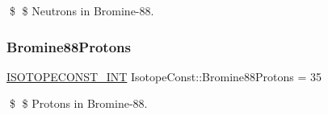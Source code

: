 \$ \$ Neutrons in Bromine-\/88. \mbox{\label{group___isotope_const-_bromine-_br88_gad11b0c52cabb1e8f37e9e9464176d9df}} 
\subsubsection{\texorpdfstring{Bromine88\+Protons}{Bromine88Protons}}
{\footnotesize\ttfamily \mbox{\hyperlink{group___isotope_const-_macros_ga5f18360b3e99483a35c32d789e62621c}{I\+S\+O\+T\+O\+P\+E\+C\+O\+N\+S\+T\+\_\+\+I\+NT}} Isotope\+Const\+::\+Bromine88\+Protons = 35}

\$ \$ Protons in Bromine-\/88. 